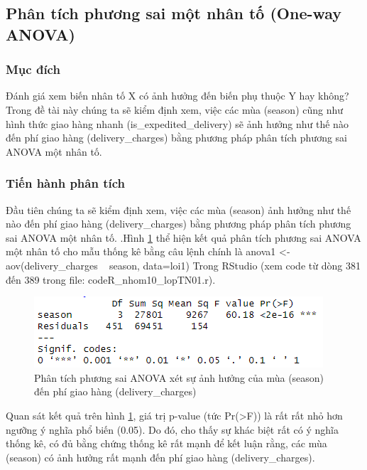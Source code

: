\subsection{Phân tích phương sai một nhân tố (One-way ANOVA)} \label{anova1}
\subsubsection{Mục đích}
Đánh giá xem biến nhân tố X có ảnh hưởng đến biến phụ thuộc Y hay không? Trong đề tài này chúng ta sẽ kiểm định xem, việc các mùa (season) cũng như hình thức giao hàng nhanh (is\_expedited\_delivery) sẽ ảnh hưởng như thế nào đến phí giao hàng (delivery\_charges) bằng phương pháp phân tích phương sai ANOVA một nhân tố.
\subsubsection{Tiến hành phân tích}
Đầu tiên chúng ta sẽ kiểm định xem, việc các mùa (season) ảnh hưởng như thế nào đến phí giao hàng (delivery\_charges) bằng phương pháp phân tích phương sai ANOVA một nhân tố. .Hình \ref{fig:5.1} thể hiện kết quả phân tích phương sai ANOVA một nhân tố cho mẫu thống kê bằng câu lệnh chính là anova1 <- aov(delivery\_charges ~ season, data=loi1) Trong RStudio (xem code từ dòng 381 đến 389 trong file: codeR\_nhom10\_lopTN01.r).
\begin{figure}[!htbp]
    \centering
    \includegraphics[width=0.6\linewidth]{graphics/5.3.1.png}
    \caption{Phân tích phương sai ANOVA xét sự ảnh hưởng của mùa (season) đến phí giao hàng (delivery\_charges)}
    \label{fig:5.1}
\end{figure}
Quan sát kết quả trên hình \ref{fig:5.1}, giá trị p-value (tức Pr(>F)) là rất rất nhỏ hơn ngưỡng ý nghĩa phổ biến (0.05). Do đó, cho thấy sự khác biệt rất có ý nghĩa thống kê, có đủ bằng chứng thống kê rất mạnh để kết luận rằng, các mùa (season) có ảnh hưởng rất mạnh đến phí giao hàng (delivery\_charges).

